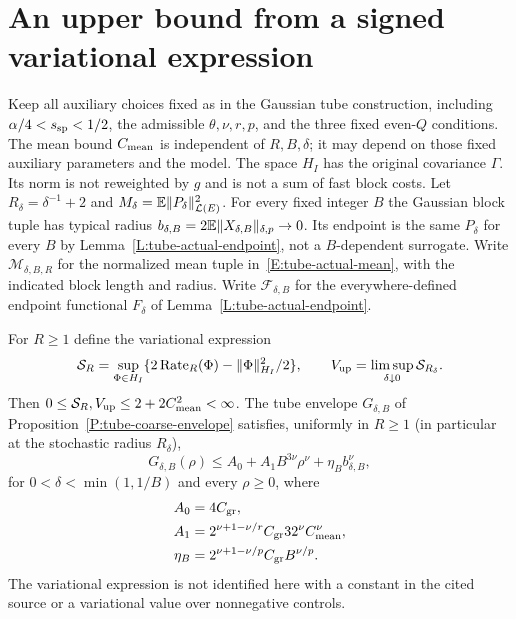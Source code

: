\section{An upper bound from a signed variational expression}
\label{S:original-signed-score-upper}

Keep all auxiliary choices fixed as in the Gaussian tube construction, including
$\alpha/4 < s_{\rm sp} < 1/2$, the admissible $\theta,\nu,r,p$, and the three
fixed even-$Q$ conditions. The mean bound $C_{\rm mean}$ is independent of
$R,B,\delta$; it may depend on those fixed auxiliary parameters and the model.
The space $H_I$ has the original covariance $\Gamma$. Its norm is not reweighted
by $g$ and is not a sum of fast block costs. Let $R_\delta = \delta^{-1}+2$ and
$M_\delta = \mathbb{E}\|P_\delta\|_{\mathcal{L}(E)}^2$. For every fixed integer $B$ the
Gaussian block tuple has typical radius $b_{\delta,B} =
2\mathbb{E}\|X_{\delta,B}\|_{\delta,p} \to 0$. Its endpoint is the same $P_\delta$ for
every $B$ by Lemma~\ref{L:tube-actual-endpoint}, not a $B$-dependent surrogate.
Write $\mathcal{M}_{\delta,B,R}$ for the normalized mean tuple
in~\eqref{E:tube-actual-mean}, with the indicated block length and radius. Write
$\mathcal{F}_{\delta,B}$ for the everywhere-defined endpoint functional
$F_\delta$ of Lemma~\ref{L:tube-actual-endpoint}.

\begin{lemma}
  \label{L:signed-score-envelope}
  For $R \ge 1$ define the variational expression
  \begin{equation}\label{E:signed-raw-score}
    \mathcal{S}_R=\sup_{\Phi\in H_I}
    \{2\operatorname{Rate}_R(\Phi)-\|\Phi\|_{H_I}^2/2\},
    \qquad V_{\rm up}=\limsup_{\delta\downarrow0}\mathcal{S}_{R_\delta}.
  \end{equation}
  Then $0 \le \mathcal{S}_R,V_{\rm up} \le 2+2C_{\rm mean}^2 < \infty$. The tube
  envelope $G_{\delta,B}$ of Proposition~\ref{P:tube-coarse-envelope} satisfies,
  uniformly in $R \ge 1$ (in particular at the stochastic radius $R_\delta$),
  \begin{equation}\label{E:signed-polynomial-envelope}
    G_{\delta,B}(\rho)\le A_0+A_1B^{3\nu}\rho^\nu
    +\eta_B b_{\delta,B}^\nu ,
  \end{equation}
  for $0 < \delta < \min(1,1/B)$ and every $\rho \ge 0$, where
  \[
    \begin{aligned}
      A_0&=4C_{\rm gr},\\
      A_1&=2^{\nu+1-\nu/r}C_{\rm gr}32^\nu C_{\rm mean}^\nu,\\
      \eta_B&=2^{\nu+1-\nu/p}C_{\rm gr}B^{\nu/p}.
    \end{aligned}
  \]
  The variational expression is not identified here with a constant in the cited
  source or a variational value over nonnegative controls.
\end{lemma}

